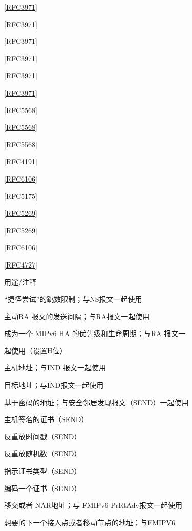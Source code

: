 \href{https://www.rfc-editor.org/rfc/rfc3971}{[RFC3971]}

\href{https://www.rfc-editor.org/rfc/rfc3971}{[RFC3971]}

\href{https://www.rfc-editor.org/rfc/rfc3971}{[RFC3971]}

\href{https://www.rfc-editor.org/rfc/rfc3971}{[RFC3971]}

\href{https://www.rfc-editor.org/rfc/rfc3971}{[RFC3971]}

\href{https://www.rfc-editor.org/rfc/rfc3971}{[RFC3971]}

\href{https://www.rfc-editor.org/rfc/rfc5568}{[RFC5568]}

\href{https://www.rfc-editor.org/rfc/rfc5568}{[RFC5568]}

\href{https://www.rfc-editor.org/rfc/rfc5568}{[RFC5568]}

\href{https://www.rfc-editor.org/rfc/rfc4191}{[RFC4191]}

\href{https://www.rfc-editor.org/rfc/rfc6106}{[RFC6106]}

\href{https://www.rfc-editor.org/rfc/rfc5175}{[RFC5175]}

\href{https://www.rfc-editor.org/rfc/rfc5269}{[RFC5269]}

\href{https://www.rfc-editor.org/rfc/rfc5269}{[RFC5269]}

\href{https://www.rfc-editor.org/rfc/rfc6106}{[RFC6106]}

\href{https://www.rfc-editor.org/rfc/rfc4727}{[RFC4727]}

用途/注释

“捷径尝试”的跳数限制；与NS报文一起使用

主动RA 报文的发送间隔；与RA报文一起使用

成为一个 MIPv6 HA 的优先级和生命周期；与RA 报文一

起使用（设置H位）

主机地址；与IND 报文一起使用

目标地址；与IND报文一起使用

基于密码的地址；与安全邻居发现报文（SEND）一起使用

主机签名的证书（SEND）

反重放时间戳（SEND）

反重放随机数（SEND）

指示证书类型（SEND）

编码一个证书（SEND）

移交或者 NAR地址；与 FMIPv6 PrRtAdv报文一起使用

想要的下一个接人点或者移动节点的地址；与FMIPV6

